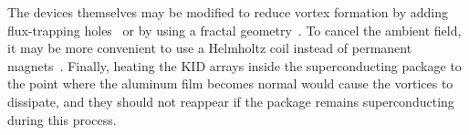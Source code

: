 The devices themselves may be modified to reduce vortex formation by adding flux-trapping holes~\autocite{Bothner2011APL,Chiaro2016SUST} or by using a fractal geometry~\autocite{deGraaf2012JAP}.
To cancel the ambient field, it may be more convenient to use a Helmholtz coil instead of permanent magnets~\autocite{Song2009PRB,Mazin2010APL,Bothner2012PRB,Nsanzineza2014PRL}.
Finally, heating the KID arrays inside the superconducting package to the point where the aluminum film becomes normal would cause the vortices to dissipate, and they should not reappear if the package remains superconducting during this process.
